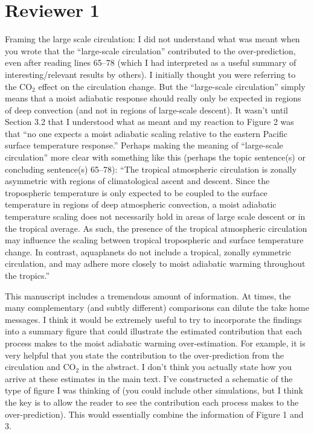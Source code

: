 \documentclass[11pt]{article}
\date{}
\title{}
\begin{document}
\section*{Reviewer 1}
\label{sec:org70fe662}
Framing the large scale circulation: I did not understand what was meant when you wrote that the ``large-scale circulation'' contributed to the over-prediction, even after reading lines 65--78 (which I had interpreted as a useful summary of interesting/relevant results by others). I initially thought you were referring to the CO\(_2\) effect on the circulation change. But the ``large-scale circulation'' simply means that a moist adiabatic response should really only be expected in regions of deep convection (and not in regions of large-scale descent). It wasn't until Section 3.2 that I understood what as meant and my reaction to Figure 2 was that ``no one expects a moist adiabatic scaling relative to the eastern Pacific surface temperature response.'' Perhaps making the meaning of ``large-scale circulation'' more clear with something like this (perhaps the topic sentence(s) or concluding sentence(s) 65--78): ``The tropical atmospheric circulation is zonally asymmetric with regions of climatological ascent and descent. Since the tropospheric temperature is only expected to be coupled to the surface temperature in regions of deep atmospheric convection, a moist adiabatic temperature scaling does not necessarily hold in areas of large scale descent or in the tropical average. As such, the presence of the tropical atmospheric circulation may influence the scaling between tropical tropospheric and surface temperature change. In contrast, aquaplanets do not include a tropical, zonally symmetric circulation, and may adhere more closely to moist adiabatic warming throughout the tropics.''

This manuscript includes a tremendous amount of information. At times, the many complementary (and subtly different) comparisons can dilute the take home messages. I think it would be extremely useful to try to incorporate the findings into a summary figure that could illustrate the estimated contribution that each process makes to the moist adiabatic warming over-estimation. For example, it is very helpful that you state the contribution to the over-prediction from the circulation and CO\(_2\) in the abstract. I don't think you actually state how you arrive at these estimates in the main text. I've constructed a schematic of the type of figure I was thinking of (you could include other simulations, but I think the key is to allow the reader to see the contribution each process makes to the over-prediction). This would essentially combine the information of Figure 1 and 3.
\end{document}
